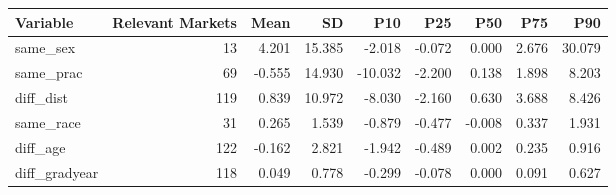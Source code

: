 \begin{table}[!h]
\centering
\begin{tabular}{lrrrrrrrr}
\toprule
Variable & Relevant Markets & Mean & SD & P10 & P25 & P50 & P75 & P90\\
\midrule
same\_sex & 13 & 4.201 & 15.385 & -2.018 & -0.072 & 0.000 & 2.676 & 30.079\\
same\_prac & 69 & -0.555 & 14.930 & -10.032 & -2.200 & 0.138 & 1.898 & 8.203\\
diff\_dist & 119 & 0.839 & 10.972 & -8.030 & -2.160 & 0.630 & 3.688 & 8.426\\
same\_race & 31 & 0.265 & 1.539 & -0.879 & -0.477 & -0.008 & 0.337 & 1.931\\
diff\_age & 122 & -0.162 & 2.821 & -1.942 & -0.489 & 0.002 & 0.235 & 0.916\\
\addlinespace
diff\_gradyear & 118 & 0.049 & 0.778 & -0.299 & -0.078 & 0.000 & 0.091 & 0.627\\
\bottomrule
\end{tabular}
\end{table}
